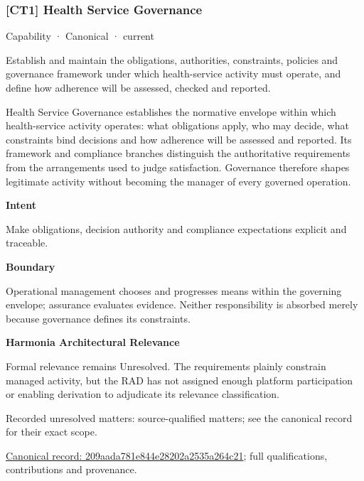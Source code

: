 \subsubsection{[CT1] Health Service Governance}

\label{element:209aada781e844e28202a2535a264c21}
{\small Capability · Canonical · current}\par

Establish and maintain the obligations, authorities, constraints, policies and governance framework under which health-service activity must operate, and define how adherence will be assessed, checked and reported.



Health Service Governance establishes the normative envelope within which health-service activity operates: what obligations apply, who may decide, what constraints bind decisions and how adherence will be assessed and reported. Its framework and compliance branches distinguish the authoritative requirements from the arrangements used to judge satisfaction. Governance therefore shapes legitimate activity without becoming the manager of every governed operation.



\textbf{Intent}



Make obligations, decision authority and compliance expectations explicit and traceable.



\textbf{Boundary}



Operational management chooses and progresses means within the governing envelope; assurance evaluates evidence. Neither responsibility is absorbed merely because governance defines its constraints.



\textbf{Harmonia Architectural Relevance}



Formal relevance remains Unresolved. The requirements plainly constrain managed activity, but the RAD has not assigned enough platform participation or enabling derivation to adjudicate its relevance classification.


{\small Recorded unresolved matters: source-qualified matters; see the canonical record for their exact scope.}\par
{\footnotesize \href{../../../../continuum/strategy/capability/209aada781e844e28202a2535a264c21.md}{Canonical record: 209aada781e844e28202a2535a264c21}; full qualifications, contributions and provenance.}\par
